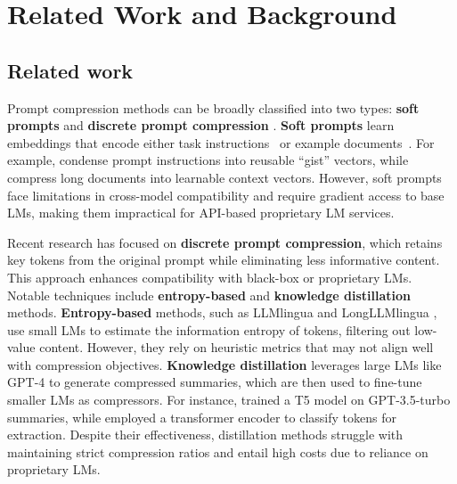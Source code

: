 \section{Related Work and Background}
\subsection{Related work}\label{sec:related}


Prompt compression methods can be broadly classified into two types: \textbf{soft prompts} and \textbf{discrete prompt compression} \citep{efficient}. \textbf{Soft prompts} learn embeddings that encode either task instructions~\citep{gist} or example documents~\citep{soft}. For example, \citet{gist} condense prompt instructions into reusable ``gist'' vectors, while \citet{soft} compress long documents into learnable context vectors. However, soft prompts face limitations in cross-model compatibility and require gradient access to base LMs, making them impractical for API-based proprietary LM services.


Recent research has focused on \textbf{discrete prompt compression}, which retains key tokens from the original prompt while eliminating less informative content. This approach enhances compatibility with black-box or proprietary LMs. Notable techniques include \textbf{entropy-based} and \textbf{knowledge distillation} methods.
\textbf{Entropy-based} methods, such as LLMlingua and LongLLMlingua \citep{llmlingua,longllmlingua}, use small LMs to estimate the information entropy of tokens, filtering out low-value content. However, they rely on heuristic metrics that may not align well with compression objectives.
\textbf{Knowledge distillation} leverages large LMs like GPT-4 \citep{gpt4} to generate compressed summaries, which are then used to fine-tune smaller LMs as compressors. For instance, \citet{recomp} trained a T5 model on GPT-3.5-turbo summaries, while \citet{lingua2} employed a transformer encoder to classify tokens for extraction. Despite their effectiveness, distillation methods struggle with maintaining strict compression ratios and entail high costs due to reliance on proprietary LMs.

